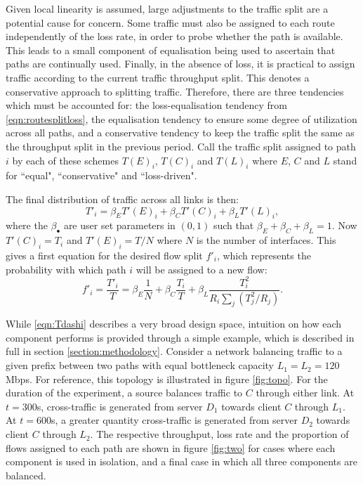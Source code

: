 Given local linearity is assumed, large adjustments to the traffic split are a potential cause for concern.
Some traffic must also be assigned to each route independently of the loss rate, in order to probe whether the path is available.
This leads to a small component of equalisation being used to ascertain that paths are continually used.
Finally, in the absence of loss, it is practical to assign traffic according to the current traffic throughput split.  
This denotes a conservative approach to splitting traffic.
Therefore, there are three tendencies which must be accounted for: the loss-equalisation tendency from \eqref{eqn:routesplitloss}, the equalisation tendency to ensure some degree of utilization across all paths, and a conservative tendency to keep the traffic split the same as the throughput split in the previous period.
Call the traffic split assigned to path $i$  by each of these schemes $T(E)_i$, $T(C)_i$ and $T(L)_i$ where $E$, $C$ and $L$ stand for ``equal", ``conservative" and ``loss-driven".

The final distribution of traffic across all links is then:
$$
T'_i = \beta_E T'(E)_i + \beta_C T'(C)_i + \beta_L T'(L)_i,
$$
where the $\beta_\bullet$ are user set parameters in $(0,1)$ such that $\beta_E+\beta_C + \beta_L = 1$.  Now $T'(C)_i = T_i$ and $T'(E)_i = T/N$ where $N$ is the number of interfaces. 
This gives a first equation for the desired flow split $f'_i$, which represents the probability with which path $i$ will be assigned to a new flow:
\begin{equation}
f'_i = \frac{T'_i}{T} =  \beta_E \frac{1}{N} + \beta_C \frac{T_i}{T} +
\beta_L \frac{T_i^2}{R_i \sum_j (T_j^2/R_j)}.
\label{eqn:Tdashi}
\end{equation}


While \eqref{eqn:Tdashi} describes a very broad design space, intuition on how each component performs is provided through a simple example, which is described in full in section \ref{section:methodology}. 
Consider a network balancing traffic to a given prefix between two paths with equal bottleneck capacity $L_1=L_2=120$Mbps.
For reference, this topology is illustrated in figure \ref{fig:topo}.
For the duration of the experiment, a source balances traffic to $C$ through either link.
At $t=300$s, cross-traffic is generated from server $D_1$ towards client $C$ through $L_1$.
At $t=600$s, a greater quantity cross-traffic is generated from server $D_2$ towards client $C$ through $L_2$.
The respective throughput, loss rate and the proportion of flows assigned to each path are shown in figure \ref{fig:two} for cases where each component is used in isolation, and a final case in which all three components are balanced.

